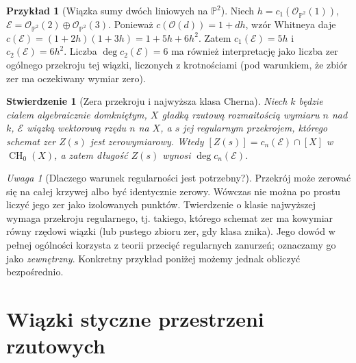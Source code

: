 \documentclass[11pt,a4paper,openany]{report}
\numberwithin{equation}{section}
\theoremstyle{plain}
\newtheorem{stwierdzenie}[twierdzenie]{Stwierdzenie}
\theoremstyle{definition}
\newtheorem{przyklad}[twierdzenie]{Przykład}
\theoremstyle{remark}
\newtheorem{uwaga}[twierdzenie]{Uwaga}
\newcommand{\PP}{\mathbb P}
\begin{document}
\begin{przyklad}[Wiązka sumy dwóch liniowych na $\PP^2$]
\label{prz:ga7-chern-sum}
Niech $h=c_1(\mathcal O_{\PP^2}(1))$,
$\mathcal E=\mathcal O_{\PP^2}(2)\oplus\mathcal O_{\PP^2}(3)$.
Ponieważ $c(\mathcal O(d))=1+dh$, wzór Whitneya daje
$c(\mathcal E)=(1+2h)(1+3h)=1+5h+6h^2$.
Zatem $c_1(\mathcal E)=5h$ i $c_2(\mathcal E)=6h^2$.
Liczba $\deg c_2(\mathcal E)=6$ ma również
interpretację jako liczba zer ogólnego przekroju
tej wiązki, liczonych z krotnościami (pod warunkiem,
że zbiór zer ma oczekiwany wymiar zero).
\end{przyklad}

\begin{stwierdzenie}[Zera przekroju i najwyższa klasa Cherna]
\label{st:ga7-zero-section}
Niech $k$ będzie ciałem algebraicznie domkniętym,
$X$ gładką rzutową rozmaitością wymiaru $n$ nad $k$,
$\mathcal E$ wiązką wektorową rzędu $n$ na $X$,
a $s$ jej regularnym przekrojem, którego schemat zer
$Z(s)$ jest zerowymiarowy. Wtedy
$[Z(s)]=c_n(\mathcal E)\cap[X]$ w $\operatorname{CH}_0(X)$,
a zatem długość $Z(s)$ wynosi $\deg c_n(\mathcal E)$.
\end{stwierdzenie}
\begin{uwaga}[Dlaczego warunek regularności jest potrzebny?]
Przekrój może zerować się na całej krzywej albo
być identycznie zerowy. Wówczas nie można po prostu
liczyć jego zer jako izolowanych punktów. Twierdzenie
o klasie najwyższej wymaga przekroju regularnego,
tj. takiego, którego schemat zer ma kowymiar równy
rzędowi wiązki (lub pustego zbioru zer, gdy klasa znika).
Jego dowód w pełnej ogólności korzysta z teorii
przecięć regularnych zanurzeń; oznaczamy go jako
\emph{zewnętrzny}. Konkretny przykład poniżej
możemy jednak obliczyć bezpośrednio.
\end{uwaga}

\section{Wiązki styczne przestrzeni rzutowych}
\label{sec:ga7-tangent}
\end{document}
